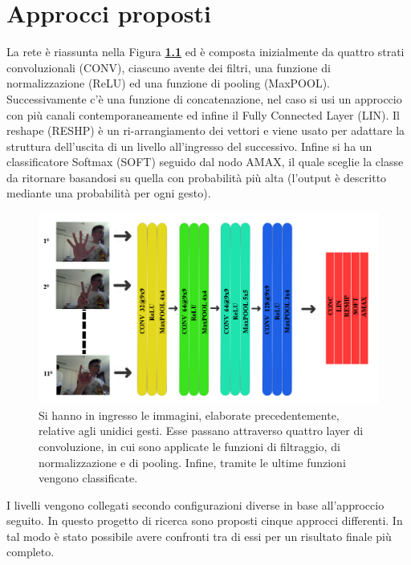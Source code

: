 \chapter{Approcci proposti}

La rete è riassunta nella Figura \textbf{\ref{fig:strutturarete}} ed è composta inizialmente da quattro strati convoluzionali (CONV), ciascuno avente dei filtri, una funzione di normalizzazione (ReLU) ed una funzione di pooling (MaxPOOL). Successivamente c'è una funzione di concatenazione, nel caso si usi un approccio con più canali contemporaneamente ed infine il Fully Connected Layer (LIN).
Il reshape (RESHP) è un ri-arrangiamento dei vettori e viene usato per adattare la struttura dell'uscita di un livello all'ingresso del successivo.
Infine si ha un classificatore Softmax (SOFT) seguido dal nodo AMAX, il quale sceglie la classe da ritornare basandosi su quella con probabilità più alta (l'output è descritto mediante una probabilità per ogni gesto).

\begin{figure}
\centering
\includegraphics[width=%
1\textwidth]{figures/LivelliConv}
\caption[Struttura della rete.]{Si hanno in ingresso le immagini, elaborate precedentemente, relative agli unidici gesti. Esse passano attraverso quattro layer di convoluzione, in cui sono applicate le funzioni di filtraggio, di normalizzazione e di pooling. Infine, tramite le ultime funzioni vengono classificate. 
\label{fig:strutturarete}}
\end{figure}

I livelli vengono collegati secondo configurazioni diverse in base all'approccio seguito. In questo progetto di ricerca sono proposti cinque approcci differenti. In tal modo è stato possibile avere confronti tra di essi per un risultato finale più completo.\\

